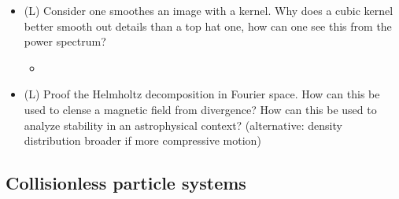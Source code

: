 \begin{itemize}
\begin{itemize}
    \end{itemize}
    \item (L) Consider one smoothes an image with a kernel. Why does a cubic kernel better smooth out details than a top hat one, how can one see this from the power spectrum?
    \begin{itemize}
        \item {}
    \end{itemize}
    \item (L) Proof the Helmholtz decomposition in Fourier space. How can this be used to clense a
    magnetic field from divergence? How can this be used to analyze stability in an astrophysical context?
    (alternative: density distribution broader if more compressive motion)
\end{itemize}

\subsection*{Collisionless particle systems}

